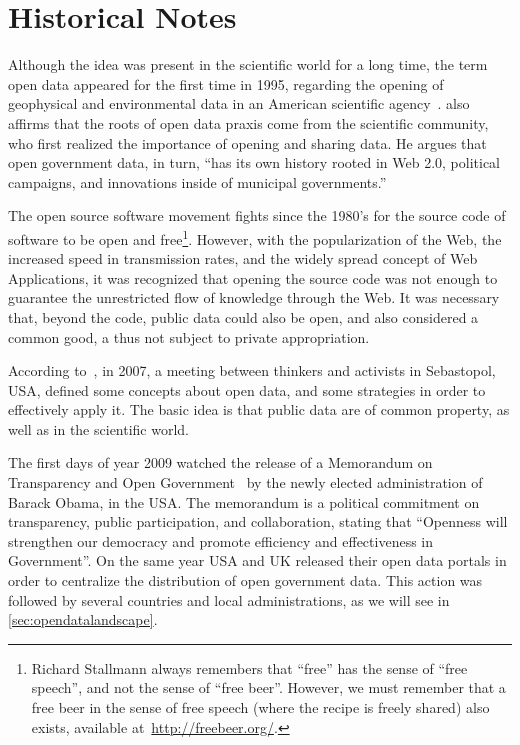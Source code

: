 \section{Historical Notes}

Although the idea was present in the scientific world for a long time, the term open data appeared for the first time in 1995, regarding the opening of geophysical and environmental data in an American scientific agency~\cite{Chignard2013}. 
 also affirms that the roots of open data praxis come from the scientific community, who first realized the importance of opening and sharing data.
He argues that open government data, in turn, ``has its own history rooted in Web 2.0, political campaigns, and innovations inside of municipal governments.''

The open source software movement fights since the 1980's for the source code of software to be open and free\footnote{Richard Stallmann always remembers that ``free'' has the sense of ``free speech'', and not the sense of ``free beer''. However, we must remember that a free beer in the sense of free speech (where the recipe is freely shared) also exists, available at~\url{http://freebeer.org/}.}.
However, with the popularization of the Web, the increased speed in transmission rates, and the widely spread concept of Web Applications, it was recognized that opening the source code was not enough to guarantee the unrestricted flow of knowledge through the Web.
It was necessary that, beyond the code, public data could also be open, and also considered a common good, a thus not subject to private appropriation.

According to~, in 2007, a meeting between thinkers and activists in Sebastopol, USA, defined some concepts about open data, and some strategies in order to effectively apply it.
The basic idea is that public data are of common property, as well as in the scientific world.

The first days of year 2009 watched the release of a Memorandum on Transparency and Open Government~\cite{Obama2009} by the newly elected administration of Barack Obama, in the USA.
The memorandum is a political commitment on transparency, public participation, and collaboration, stating that ``Openness will strengthen our democracy and promote efficiency and effectiveness in Government''.
On the same year USA and UK released their open data portals in order to centralize the distribution of open government data.
This action was followed by several countries and local administrations, as we will see in \autoref{sec:opendatalandscape}. 

